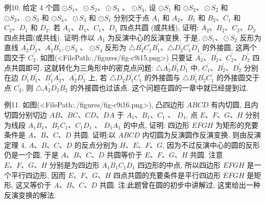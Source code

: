 例10. 给定 4 个圆 $\odot S_1 、 \odot S_2 、 \odot S_3$ 、 $\odot S_4$, 设 $\odot S_1$ 和 $\odot S_2 、 \odot S_2$ 和 $\odot S_3 、 \odot S_3$ 和 $\odot S_4 、 \odot S_4$ 和 $\odot S_1$ 分别交于点 $A_1$ 和 $A_2 、 B_1$ 和 $B_2 、 C_1$ 和 $C_2 、 D_1$ 和 $D_2$. 若 $A_1 、 B_1 、 C_1 、 D_1$ 四点共圆 (或共线), 证明: $A_2 、 B_2 、 C_2 、 D_2$ 四点共圆(或共线).
证明:作以 $A_1$ 为反演中心的反演变换, 于是, $\odot S_1 、 \odot S_2$ 反形为直线 $A_2^{\prime} D_1^{\prime} 、 A_2^{\prime} B_1^{\prime}, \odot S_3$ 、 $\odot S_4$ 反形为 $\triangle B_2^{\prime} C_1^{\prime} B_1^{\prime} 、 \triangle D_2^{\prime} C_1^{\prime} D_1^{\prime}$ 的外接圆, 这两个圆交于 $C_2^{\prime}$. 如图(<FilePath:./figures/fig-c9i15.png>) 只要证 $A_2^{\prime} 、 B_2^{\prime} 、 C_2^{\prime} 、 D_2^{\prime}$ 四点共圆即可.
这就转化为三角形中的密克点问题:
$\triangle A_2^{\prime} B_1^{\prime} D_1^{\prime}$ 中, $C_1^{\prime} 、 B_2^{\prime} 、 D_2^{\prime}$ 分别在边 $D_1^{\prime} B_1^{\prime} 、 B_1^{\prime} A_2^{\prime} 、 A_2^{\prime} D_1^{\prime}$ 上, 若 $\triangle D_2^{\prime} D_1^{\prime} C_1^{\prime}$ 的外接圆与 $\triangle B_1^{\prime} B_2^{\prime} C_1^{\prime}$ 的外接圆交于点 $C_2^{\prime}$, 则 $\triangle A_2^{\prime} D_2^{\prime} B_2^{\prime}$ 的外接圆也过该点.
这个问题在圆的一章中就已经提到过.



例11. 如图(<FilePath:./figures/fig-c9i16.png>), 凸四边形 $A B C D$ 有内切圆, 且内切圆分别切边 $A B 、 B C 、 C D 、 D A$ 于 $A_1 、 B_1 、 C_1$ 、 $D_1$, 点 $E 、 F 、 G 、 H$ 分别为线段 $A_1 B_1 、 B_1 C_1 、 C_1 D_1$ 、 $D_1 A_1$ 的中点, 证明: 四边形 $E F G H$ 为矩形的充要条件是 $A 、 B 、 C 、 D$ 共圆.
证明:以 $A B C D$ 内切圆为反演圆作反演变换, 则由反演定理 4, $A 、 B 、 C 、 D$ 的反点分别为 $H 、 E 、 F 、 G$, 因为不过反演中心的圆的反形仍是一个圆, 于是 $A 、 B 、 C 、 D$ 共圆等价于 $E 、 F 、 G 、 H$ 共圆.
注意 $E 、 F 、 G 、 H$ 分别是为四边形 $A_1 B_1 C_1 D_1$ 四边形的中点, 所以四边形 $E F G H$ 是一个平行四边形, 因而 $E 、 F 、 G 、 H$ 四点共圆的充要条件是平行四边形 $E F G H$ 是矩形, 这又等价于 $A 、 B 、 C 、 D$ 共圆.
注:此题曾在圆的初步中讲解过, 这里给出一种反演变换的解法.



